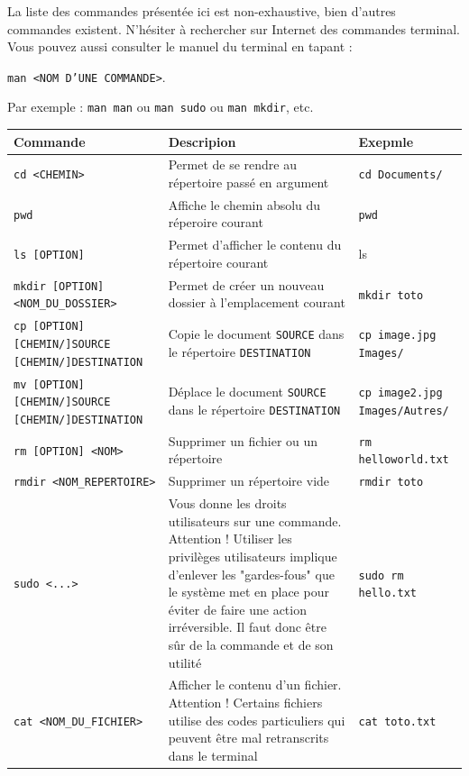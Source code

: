\documentclass[12pt]{book}
\begin{document}
	La liste des commandes présentée ici est non-exhaustive, bien d'autres commandes existent.
	N'hésiter à rechercher sur Internet des commandes terminal.
	Vous pouvez aussi consulter le manuel du terminal en tapant :
	\begin{center}
		\texttt{man <NOM D'UNE COMMANDE>}.
	\end{center}
	Par exemple : \texttt{man man} ou \texttt{man sudo} ou \texttt{man mkdir}, etc.
	\begin{longtable}{|p{}|p{}|p{}|}\hline
		\rowcolor{lightgray}Commande & Descripion & Exepmle\\\hline
		\endhead
		\texttt{cd <CHEMIN>} & Permet de se rendre au répertoire passé en argument & \texttt{cd Documents/}\\\hline
		\texttt{pwd} & Affiche le chemin absolu du réperoire courant & \texttt{pwd}\\\hline
		\texttt{ls [OPTION]} & Permet d'afficher le contenu du répertoire courant & ls\\\hline
		\texttt{mkdir [OPTION] <NOM\_DU\_DOSSIER>} & Permet de créer un nouveau dossier à l'emplacement courant & \texttt{mkdir toto}\\\hline
		\texttt{cp [OPTION] [CHEMIN/]SOURCE [CHEMIN/]DESTINATION} & Copie le document \texttt{SOURCE} dans le répertoire \texttt{DESTINATION} & \texttt{cp image.jpg Images/}\\\hline
		\texttt{mv [OPTION] [CHEMIN/]SOURCE [CHEMIN/]DESTINATION} & Déplace le document \texttt{SOURCE} dans le répertoire \texttt{DESTINATION} & \texttt{cp image2.jpg Images/Autres/}\\\hline
		\texttt{rm [OPTION] <NOM>} & Supprimer un fichier ou un répertoire & \texttt{rm helloworld.txt}\\\hline
		\texttt{rmdir <NOM\_REPERTOIRE>} & Supprimer un répertoire vide & \texttt{rmdir toto}\\\hline
		\texttt{sudo <...>} & Vous donne les droits utilisateurs sur une commande. Attention ! Utiliser les privilèges utilisateurs implique d'enlever les "gardes-fous" que le système met en place pour éviter de faire une action irréversible. Il faut donc être sûr de la commande et de son utilité & \texttt{sudo rm hello.txt}\\\hline
		\texttt{cat <NOM\_DU\_FICHIER>} & Afficher le contenu d'un fichier. Attention ! Certains fichiers utilise des codes particuliers qui peuvent être mal retranscrits dans le terminal & \texttt{cat toto.txt}\\\hline

\end{longtable}
\end{document}

